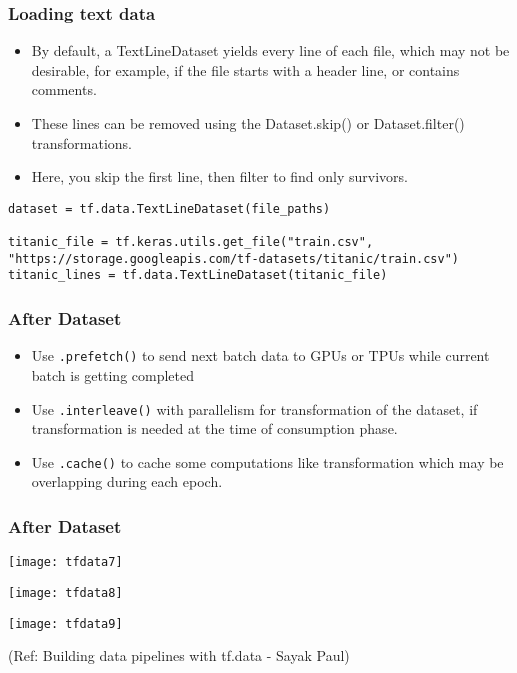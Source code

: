 \begin{frame}[fragile]\frametitle{Loading text data}

\begin{itemize}
\item By default, a TextLineDataset yields every line of each file, which may not be desirable, for example, if the file starts with a header line, or contains comments. \item These lines can be removed using the Dataset.skip() or Dataset.filter() transformations. 
\item Here, you skip the first line, then filter to find only survivors.
\end{itemize}


\begin{lstlisting}
dataset = tf.data.TextLineDataset(file_paths)

titanic_file = tf.keras.utils.get_file("train.csv", "https://storage.googleapis.com/tf-datasets/titanic/train.csv")
titanic_lines = tf.data.TextLineDataset(titanic_file)
\end{lstlisting}
\end{frame}


\begin{frame}[fragile]\frametitle{After Dataset}
\begin{itemize}
\item Use \lstinline|.prefetch()| to send next batch data to GPUs or TPUs while current batch is getting completed
\item Use \lstinline|.interleave()| with parallelism for transformation of the dataset, if transformation is needed at the time of consumption phase. 
\item Use \lstinline|.cache()| to cache some computations like transformation which may be overlapping during each epoch.
\end{itemize}


\end{frame}

\begin{frame}[fragile]\frametitle{After Dataset}


\begin{center}
\texttt{[image: tfdata7]}

\texttt{[image: tfdata8]}


\texttt{[image: tfdata9]}

{\tiny (Ref: Building data pipelines with tf.data - Sayak Paul)}

\end{center}
\end{frame}


